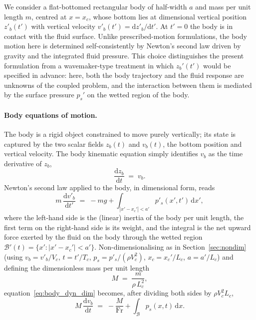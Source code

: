 \documentclass{article}
\newcommand{\Fr}{\mathrm{Fr}}
\begin{document}
We consider a flat-bottomed rectangular body of half-width $a$ and mass per unit length $m$, centred at $x = x_c$, whose bottom lies at dimensional vertical position $z'_b(t')$ with vertical velocity $v'_b(t') = \mathrm{d} z'_b / \mathrm{d} t'$.
\color{blue}
At $t' = 0$ the body is in contact with the fluid surface.
Unlike prescribed-motion formulations, the body motion here is determined self-consistently by Newton's second law driven by gravity and the integrated fluid pressure.
This choice distinguishes the present formulation from a wavemaker-type treatment in which $z_b'(t')$ would be specified in advance: here, both the body trajectory and the fluid response are unknowns of the coupled problem, and the interaction between them is mediated by the surface pressure $p_s'$ on the wetted region of the body.

\paragraph{Body equations of motion.}
The body is a rigid object constrained to move purely vertically; its state is captured by the two scalar fields $z_b(t)$ and $v_b(t)$, the bottom position and vertical velocity.
The body kinematic equation simply identifies $v_b$ as the time derivative of $z_b$,
\begin{equation}
    \frac{\mathrm{d} z_b}{\mathrm{d} t} \;=\; v_b. \label{eq:body_kin}
\end{equation}
Newton's second law applied to the body, in dimensional form, reads
\begin{equation}
    m\,\frac{\mathrm{d} v'_b}{\mathrm{d} t'} \;=\; -m g + \int_{|x' - x_c'| < a'} p'_s(x', t')\,\mathrm{d} x', \label{eq:body_dyn_dim}
\end{equation}
where the left-hand side is the (linear) inertia of the body per unit length, the first term on the right-hand side is its weight, and the integral is the net upward force exerted by the fluid on the body through the wetted region $\mathcal{B}'(t) = \{x' : |x' - x_c'| < a'\}$.
Non-dimensionalising as in Section~\ref{sec:nondim} (using $v_b = v'_b/V_c$, $t = t'/T_c$, $p_s = p'_s/(\rho V_c^2)$, $x_c = x_c'/L_c$, $a = a'/L_c$) and defining the dimensionless mass per unit length
\begin{equation}
    M \;=\; \frac{m}{\rho\,L_c^2}, \label{eq:M_definition}
\end{equation}
equation~\eqref{eq:body_dyn_dim} becomes, after dividing both sides by $\rho V_c^2 L_c$,
\begin{equation}
    M\,\frac{\mathrm{d} v_b}{\mathrm{d} t} \;=\; -\frac{M}{\Fr} + \int_{\mathcal{B}} p_s(x, t)\,\mathrm{d} x. \label{eq:body_dyn}
\end{equation}
\end{document}
